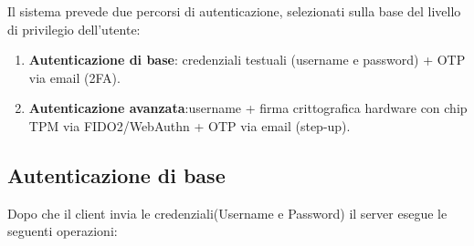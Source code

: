 Il sistema prevede due percorsi di autenticazione, selezionati sulla base del
livello di privilegio dell'utente:

\begin{enumerate}
  \item \textbf{Autenticazione di base}: credenziali
    testuali (username e password) + OTP via email (2FA).
  \item \textbf{Autenticazione avanzata}:username + firma crittografica hardware con chip TPM via
    FIDO2/WebAuthn + OTP via email (step-up).
\end{enumerate}

\subsection{Autenticazione di base}
Dopo che il client invia le credenziali(Username e Password) il server esegue le seguenti operazioni:
